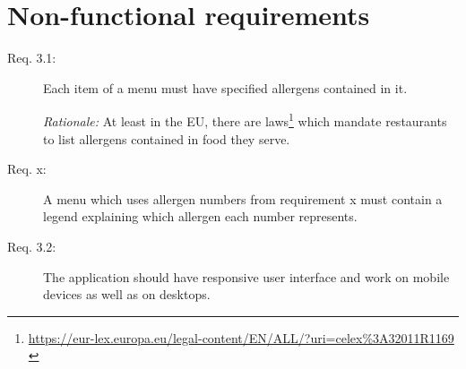 \section{Non-functional requirements}
\begin{description}
    \item [Req. 3.1:] Each item of a menu must have specified allergens contained in it.
    
    \emph{Rationale:} At least in the EU, there are laws\footnote{\url{https://eur-lex.europa.eu/legal-content/EN/ALL/?uri=celex\%3A32011R1169}  \label{fnlabel}} which mandate restaurants to list allergens contained in food they serve.
    \item [Req. x:] A menu which uses allergen numbers from requirement x must contain a legend explaining which allergen each number represents.

    \item [Req. 3.2:] The application should have responsive user interface and work on mobile devices as well as on desktops.
\end{description}

\vspace*{\fill}